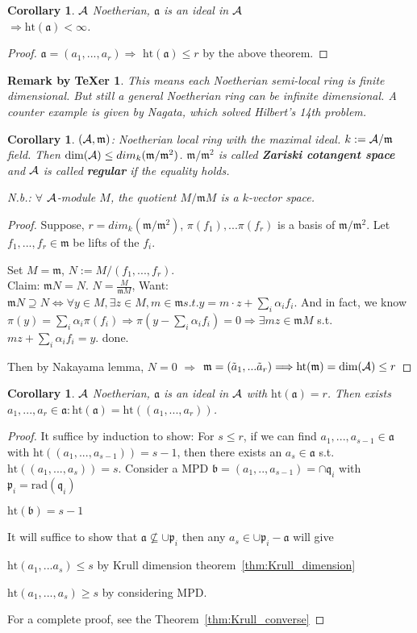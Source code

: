 \documentclass[11pt]{article}
\newtheorem{cor}[thm]{Corollary}
\newtheorem{rmkt}[thm]{Remark by TeXer}
\newcommand{\sca}{{\mathfrak a}}
\newcommand{\scb}{{\mathfrak b}}
\newcommand{\scm}{{\mathfrak m}}
\newcommand{\scp}{{\mathfrak p}}
\newcommand{\scq}{\mathfrak q}
\newcommand{\cala}{{\cal A}}
\newcommand{\Lrta}{\Longrightarrow}
\newcommand{\Llrta}{\Longleftrightarrow}
\begin{document}
\begin{cor}
$\cala$ Noetherian, $\sca$ is an ideal in $\cala$\\
$\Lrta \text{ht}(\sca)<\infty$.
\end{cor}
\begin{proof}
$\sca=(a_1,...,a_r)\Lrta$ $\text{ht}(\sca)\leq r$ by the above theorem.
\end{proof}
\begin{rmkt}
This means each Noetherian semi-local ring is finite dimensional. But still a general Noetherian ring can be infinite dimensional. A counter example is given by Nagata, which solved Hilbert's 14th problem.
\end{rmkt}
\begin{cor}
$(\cala,\scm)$: Noetherian local ring with the maximal ideal. $k:=\cala/\scm$ field. Then $\text{dim}(\cala)\leq dim_k(\scm/\scm^2)$. $\scm/\scm^2$ is called \textbf{Zariski cotangent space} and $\cala$ is called \textbf{regular} if the equality holds.

N.b.: $\forall$ $\cala$-module $M$, the quotient $M/\scm M$ is a $k$-vector space.
\end{cor}
\begin{proof}
Suppose, $r=dim_k(\scm/\scm^2)$, $\pi(f_1),...\pi(f_r)$ is a basis of $\scm/\scm^2$. Let $f_1,...,f_r\in\scm$ be lifts of the $f_i$. 

Set $M=\scm$, $N:=M/(f_1,...,f_r)$.\\
Claim: $\scm N=N$.
 $N=\frac{M}{\scm M}$, Want: $\scm N\supseteq N\Llrta\forall y\in M,\exists z\in M, m\in\scm s.t. y=m\cdot z+\sum_i\alpha_i f_i$. And in fact, we know $\pi(y)=\sum_i\alpha_i\pi(f_i)\Lrta \pi(y-\sum_i\alpha_if_i)=0\Lrta \exists mz\in \scm M$ s.t. $mz+\sum_i\alpha_i f_i=y$. done.

Then by Nakayama lemma, $N=0$ $\Lrta$ $\scm=(\tilde{a}_1,...\tilde{a}_r)\Lrta \text{ht}(\scm)=\text{dim}(\cala)\leq r$
\end{proof}

\begin{cor}
$\cala$ Noetherian, $\sca$ is an ideal in $\cala$ with $\text{ht}(\sca)=r$. Then exists $a_1,...,a_r\in\sca:\text{ht}(\sca)=\text{ht}((a_1,...,a_r))$.
\end{cor}
\begin{proof}
It suffice by induction to show: For $s\leq r$, if we can find $a_1,...,a_{s-1}\in\sca$ with $\text{ht}((a_1,...,a_{s-1}))=s-1$, then there exists an $a_s\in\sca$ s.t. $\text{ht}((a_1,...,a_s))=s$.
Consider a MPD $\scb=(a_1,..,a_{s-1})=\cap\scq_i$ with $\scp_i=\text{rad}(\scq_i)$

$\text{ht}(\scb)=s-1$

It will suffice to show that $\sca\not\subseteq \cup\scp_i $
then any $a_s\in\cup \scp_i-\sca$ will give 

$\text{ht}(a_1,...a_s)\leq s$ by Krull dimension theorem~\ref{thm:Krull_dimension}

$\text{ht}(a_1,...,a_s)\geq s$ by considering MPD.

For a complete proof, see the Theorem~\ref{thm:Krull_converse}
\end{proof}
\end{document}
